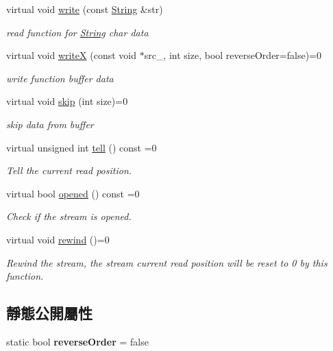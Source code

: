 \begin{DoxyCompactItemize}
virtual void \hyperlink{class_magnum_1_1_output_stream_ad94eecac88f3a210a98b2765b46cfb35}{write} (const \hyperlink{class_magnum_1_1_string}{String} \&str)
\begin{DoxyCompactList}\small\item\em read function for \hyperlink{class_magnum_1_1_string}{String} char data \end{DoxyCompactList}\item 
virtual void \hyperlink{class_magnum_1_1_output_stream_a6fee68b5bf33dab5c2674b2ff8e850be}{writeX} (const void $\ast$src\+\_\+, int size, bool reverse\+Order=false)=0
\begin{DoxyCompactList}\small\item\em write function buffer data \end{DoxyCompactList}\item 
virtual void \hyperlink{class_magnum_1_1_output_stream_ac7f8dbf68335a3dc58d8f66ed26f864d}{skip} (int size)=0
\begin{DoxyCompactList}\small\item\em skip data from buffer \end{DoxyCompactList}\item 
virtual unsigned int \hyperlink{class_magnum_1_1_output_stream_aa987bce83e1a721a48981a75270c9e55}{tell} () const  =0
\begin{DoxyCompactList}\small\item\em Tell the current read position. \end{DoxyCompactList}\item 
virtual bool \hyperlink{class_magnum_1_1_output_stream_aeb681f1259802b4bb7ce9bc95ac4ffbe}{opened} () const  =0
\begin{DoxyCompactList}\small\item\em Check if the stream is opened. \end{DoxyCompactList}\item 
virtual void \hyperlink{class_magnum_1_1_output_stream_a4d8021ad1c9c3b7d3e2f643ec12ba7bb}{rewind} ()=0
\begin{DoxyCompactList}\small\item\em Rewind the stream, the stream current read position will be reset to 0 by this function. \end{DoxyCompactList}\end{DoxyCompactItemize}
\subsection*{靜態公開屬性}
\begin{DoxyCompactItemize}
\item 
static bool {\bfseries reverse\+Order} = false\hypertarget{class_magnum_1_1_output_stream_a587cd9a315f6a56a4d7297acfa74d043}{}\label{class_magnum_1_1_output_stream_a587cd9a315f6a56a4d7297acfa74d043}

\end{DoxyCompactItemize}


